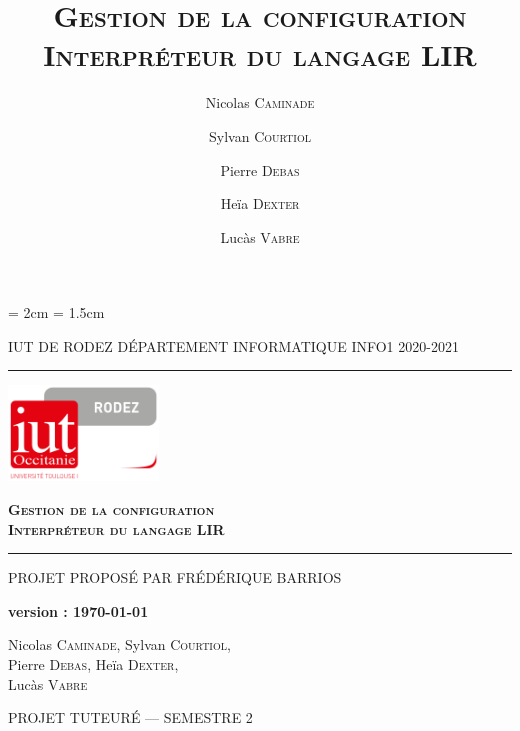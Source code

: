 \documentclass[12pt,a4paper,titlepage,openany, oneside]{report}
\title{\textsc{\textbf{Gestion de la configuration
               \\Interpréteur du langage LIR}}}
\date{}
\author{Nicolas \textsc{Caminade} \and Sylvan \textsc{Courtiol} \and Pierre
       \textsc{Debas} \and Heïa \textsc{Dexter} \and Lucàs \textsc{Vabre} }
\begin{document}

    \cfoot{\thepage}
    \headheight = 2cm
    \headsep = 1.5cm


    \begin{titlepage}
        \selectfont

        \begin{center}\normalsize
            \MakeUppercase{IUT de Rodez \hfill Département informatique \hfill INFO1 2020-2021}
        \end{center}
        \vspace*{0.1cm}
        \hrule
        \vspace*{0.2cm}
        \begin{flushright}
            \includegraphics[width=4cm]{../img/logoiut}
        \end{flushright}
        \vspace*{2cm}
        \begin{flushright}\Huge
            \textsc{\textbf{Gestion de la configuration\\Interpréteur du langage LIR}}
        \end{flushright}
        \hrule
        \begin{flushleft}
            \MakeUppercase{Projet proposé par Frédérique Barrios}
        \end{flushleft}
        \vspace*{1cm}
        \begin{center}\normalsize
        	\textbf{version : \today}
        \end{center}
        \vspace*{1cm}
        \begin{center}\Large
            Nicolas \textsc{Caminade}, Sylvan \textsc{Courtiol},\\
            Pierre \textsc{Debas}, Heïa \textsc{Dexter}, \\
            Lucàs \textsc{Vabre}
        \end{center}
        \vfill
        \begin{center}\normalsize
            \MakeUppercase{Projet tuteuré --- Semestre 2}
        \end{center}
    \end{titlepage}
\end{document}
